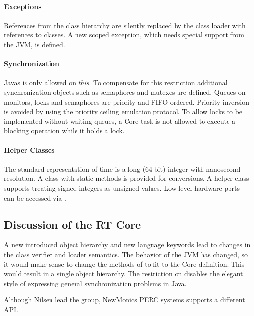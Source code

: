 \paragraph{Exceptions}

References from the  class hierarchy are
silently replaced by the class loader with references to 
classes. A new scoped exception, which needs special support from
the JVM, is defined.

\paragraph{Synchronization}


Javas  is only allowed on \emph{this}. To
compensate for this restriction additional synchronization objects
such as semaphores and mutexes are defined. Queues on monitors,
locks and semaphores are priority and FIFO ordered. Priority
inversion is avoided by using the priority ceiling emulation
protocol. To allow locks to be implemented without waiting queues, a
Core task is not allowed to execute a blocking operation while it
holds a lock.

\paragraph{Helper Classes}

The standard representation of time is a long (64-bit) integer with
nanosecond resolution. A  class with static methods is
provided for conversions. A helper class supports treating signed
integers as unsigned values. Low-level hardware ports can be
accessed via .


\subsection{Discussion of the RT Core}

A new introduced object hierarchy and new language keywords lead to
changes in the class verifier and loader semantics. The behavior of
the JVM has changed, so it would make sense to change the methods of
 to fit to the Core definition. This would result in a
single object hierarchy. The restriction on 
disables the elegant style of expressing general synchronization
problems in Java.


Although Nilsen lead the group, NewMonics PERC systems \cite{PERC}
supports a different API.



